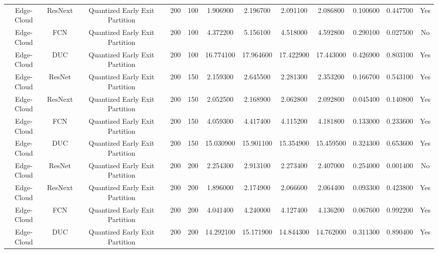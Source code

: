 \begin{tabular}{|c||c||c||c||c||c||c||c||c||c||c||c|}
Edge-Cloud & ResNext & Quantized Early Exit Partition & 200 & 100 & 1.906900 & 2.196700 & 2.091100 & 2.086800 & 0.100600 & 0.447700 & Yes \\
Edge-Cloud & FCN & Quantized Early Exit Partition & 200 & 100 & 4.372200 & 5.156100 & 4.518000 & 4.592800 & 0.290100 & 0.027500 & No \\
Edge-Cloud & DUC & Quantized Early Exit Partition & 200 & 100 & 16.774100 & 17.964600 & 17.422900 & 17.443000 & 0.426900 & 0.803100 & Yes \\
Edge-Cloud & ResNet & Quantized Early Exit Partition & 200 & 150 & 2.159300 & 2.645500 & 2.281300 & 2.353200 & 0.166700 & 0.543100 & Yes \\
Edge-Cloud & ResNext & Quantized Early Exit Partition & 200 & 150 & 2.052500 & 2.168900 & 2.062800 & 2.092800 & 0.045400 & 0.140800 & Yes \\
Edge-Cloud & FCN & Quantized Early Exit Partition & 200 & 150 & 4.059300 & 4.417400 & 4.115200 & 4.181800 & 0.133000 & 0.233600 & Yes \\
Edge-Cloud & DUC & Quantized Early Exit Partition & 200 & 150 & 15.030900 & 15.901100 & 15.354900 & 15.459500 & 0.324300 & 0.653600 & Yes \\
Edge-Cloud & ResNet & Quantized Early Exit Partition & 200 & 200 & 2.254300 & 2.913100 & 2.273400 & 2.407000 & 0.254000 & 0.001400 & No \\
Edge-Cloud & ResNext & Quantized Early Exit Partition & 200 & 200 & 1.896000 & 2.174900 & 2.066600 & 2.064400 & 0.093300 & 0.423800 & Yes \\
Edge-Cloud & FCN & Quantized Early Exit Partition & 200 & 200 & 4.041400 & 4.240000 & 4.127400 & 4.136200 & 0.067600 & 0.992200 & Yes \\
Edge-Cloud & DUC & Quantized Early Exit Partition & 200 & 200 & 14.292100 & 15.171900 & 14.844300 & 14.762000 & 0.311300 & 0.890400 & Yes \\
\bottomrule
\end{tabular}
